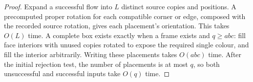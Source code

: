\begin{proof}
Expand a successful flow into $L$ distinct source copies and positions.
A precomputed proper rotation for each compatible corner or edge,
composed with the recorded source rotation, gives each placement's
orientation. This takes $O(L)$ time. A complete box exists exactly when a
frame exists and $q\ge abc$: fill face interiors with unused copies
rotated to expose the required single colour, and fill the interior
arbitrarily. Writing these placements takes $O(abc)$ time.
After the initial rejection test, the number of placements is at most $q$,
so both unsuccessful and successful inputs take $O(q)$ time.
\end{proof}
